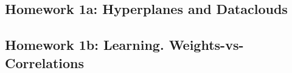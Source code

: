 \documentclass[12pt]{article}
\begin{document}
      \subsubsection*{}
      \subsubsection*{}
      \subsubsection*{}
      \subsubsection*{}
      \subsubsection*{}
    \newpage

    \subsection*{Homework 1a: Hyperplanes and Dataclouds}
      \subsubsection*{}
      \subsubsection*{}
      \subsubsection*{}
      \subsubsection*{}
      \subsubsection*{}
    \newpage

    \subsection*{Homework 1b: Learning.  Weights-vs-Correlations}
      \subsubsection*{}
      \subsubsection*{}
\end{document}
